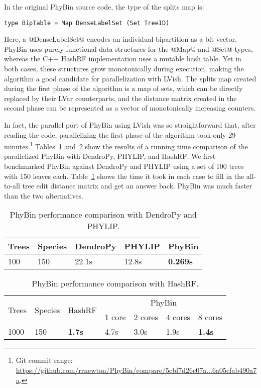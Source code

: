 In the original PhyBin source code, the type of the splits map is:

\singlespacing
\begin{lstlisting}
type BipTable = Map DenseLabelSet (Set TreeID)
\end{lstlisting}
\doublespacing

\noindent Here, a @DenseLabelSet@ encodes an individual bipartition as
a bit vector.  PhyBin uses purely functional data structures for the
@Map@ and @Set@ types, whereas the C++ HashRF implementation uses a
mutable hash table.  Yet in both cases, these structures grow
monotonically during execution, making the algorithm a good candidate
for parallelization with LVish.  The splits map created during the
first phase of the algorithm is a map of sets, which can be directly
replaced by their LVar counterparts, and the distance matrix created
in the second phase can be represented as a vector of monotonically
increasing counters.

In fact, the parallel port of PhyBin using LVish was so
straightforward that, after reading the code, parallelizing the first
phase of the algorithm took only 29 minutes.\footnote{Git commit
  range:
  \url{https://github.com/rrnewton/PhyBin/compare/5cbf7d26c07a...6a05cfab490a7a}.}
Tables~\ref{t:phybin-bench} and~\ref{t:phybin-bench-hashrf} show the
results of a running time comparison of the parallelized PhyBin with
DendroPy, PHYLIP, and HashRF.  We first benchmarked PhyBin against
DendroPy and PHYLIP using a set of 100 trees with 150 leaves each.
Table~\ref{t:phybin-bench} shows the time it took in each case to fill
in the all-to-all tree edit distance matrix and get an answer back.
PhyBin was much faster than the two alternatives.

\begin{table}
\begin{tabularx}{.75\textwidth}{XXXXX}
Trees & Species & DendroPy & PHYLIP & PhyBin    \\ \hline
100   & 150     & 22.1s    & 12.8s  & \textbf{0.269s}
\end{tabularx}
\caption{PhyBin performance comparison with DendroPy and PHYLIP.}
\label{t:phybin-bench}
\end{table}

\begin{table}
\begin{tabularx}{\textwidth}{XXXXXXX}
\multirow{2}{*}{Trees} & \multirow{2}{*}{Species} & \multirow{2}{*}{HashRF} & \multicolumn{4}{c}{PhyBin}                \\
                       &                          &                         & 1 core & 2 cores & 4 cores & 8 cores      \\ \hline
1000                   & 150                      & \textbf{1.7s}           & 4.7s   & 3.0s    & 1.9s    & \textbf{1.4s}
\end{tabularx}
\caption{PhyBin performance comparison with HashRF.}
\label{t:phybin-bench-hashrf}
\end{table}

